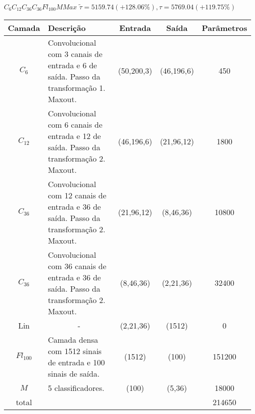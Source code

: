 \begin{tiny}
\begin{table}[H]
	$C_6C_{12}C_{36}C_{36}Fl_{100}MMax$ $\tilde{\tau}=5159.74 (+128.06\%), \tau=5769.04 (+119.75\%)$\newline
	\begin{tabularx}{\linewidth}{ |c|X|c|c|c| }
		\hline
		Camada & Descrição & Entrada & Saída & Parâmetros \\ \hline
		$C_{6}$ & Convolucional com 3 canais de entrada e 6 de saída. Passo da transformação 1. Maxout. & (50,200,3) & (46,196,6) & 450 \\ \hline
		$C_{12}$ & Convolucional com 6 canais de entrada e 12 de saída. Passo da transformação 2. Maxout. & (46,196,6) & (21,96,12) & 1800 \\ \hline
		$C_{36}$ & Convolucional com 12 canais de entrada e 36 de saída. Passo da transformação 2. Maxout. & (21,96,12) & (8,46,36) & 10800 \\ \hline
		$C_{36}$ & Convolucional com 36 canais de entrada e 36 de saída. Passo da transformação 2. Maxout. & (8,46,36) & (2,21,36) & 32400 \\ \hline
		Lin & \multicolumn{1}{c|}{-} & (2,21,36) & (1512) & 0 \\ \hline
		$Fl_{100}$ & Camada densa com 1512 sinais de entrada e 100 sinais de saída. & (1512) & (100) & 151200 \\ \hline
		$M$ & 5 classificadores. & (100) & (5,36) & 18000 \\ \hline
		total &  &  &  & 214650 \\ \hline
	\end{tabularx}
\end{table}

\end{tiny}